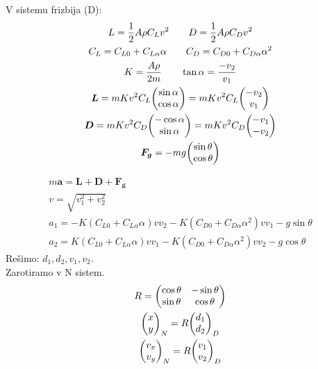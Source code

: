 \documentclass[11pt,a4paper]{article}
\begin{document}
V sistemu frizbija (D):
\begin{gather}
L = \dfrac{1}{2} A \rho C_L v^2 \qquad D = \dfrac{1}{2} A \rho C_D v^2\\
C_L = C_{L0} + C_{L \alpha} \alpha \qquad C_D = C_{D0} + C_{D \alpha} \alpha^2\\
K = \dfrac{A \rho}{2 m} \qquad \tan \alpha = \dfrac{-v_2}{v_1}\\
\bm L = m K v^2 C_L \mqty(\sin \alpha \\ \cos \alpha) = m K v^2 C_L \mqty(-v_2 \\ v_1\\)\\
\bm D = m K v^2 C_D \mqty(-\cos \alpha \\ \sin \alpha) = m K v^2 C_D \mqty(-v_1 \\ -v_2\\)\\
\bm F_{\bm g} = - m g  \mqty(\sin \theta \\ \cos \theta)\\
\end{gather}

\begin{gather}
m \bm a = \bm L + \bm D + \bm F_{\bm g}\\
v = \sqrt{v_1^2 + v_2^2}\\
a_1 = -K (C_{L0} + C_{L \alpha} \alpha) v v_2 - K (C_{D0} + C_{D \alpha} \alpha^2) v v_1 - g \sin \theta\\
a_2 = K (C_{L0} + C_{L \alpha} \alpha) v v_1 - K (C_{D0} + C_{D \alpha} \alpha^2) v v_2 - g \cos\theta
\end{gather}
Rešimo: \(d_1, d_2, v_1, v_2 \).\\
Zarotiramo v N sistem.
\begin{gather}
R = \mqty(\cos \theta & -\sin \theta \\ \sin \theta & \cos \theta)\\
\mqty(x \\ y)_N = R \mqty(d_1 \\ d_2)_D\\
\mqty(v_x \\ v_y)_N = R \mqty(v_1 \\ v_2)_D
\end{gather}
\end{document}
